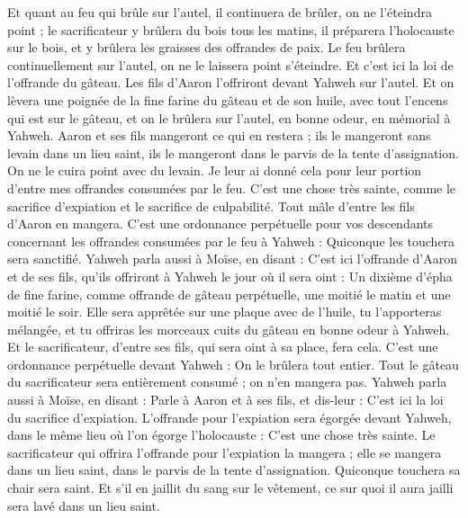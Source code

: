 \begin{multicols}{2}
Et quant au feu qui brûle sur l'autel, il continuera de brûler, on ne l'éteindra point ; le sacrificateur y brûlera du bois tous les matins, il préparera l'holocauste sur le bois, et y brûlera les graisses des offrandes de paix.
Le feu brûlera continuellement sur l'autel, on ne le laissera point s'éteindre.
Et c'est ici la loi de l'offrande du gâteau. Les fils d'Aaron l'offriront devant Yahweh sur l'autel.
Et on lèvera une poignée de la fine farine du gâteau et de son huile, avec tout l'encens qui est sur le gâteau, et on le brûlera sur l'autel, en bonne odeur, en mémorial à Yahweh.
Aaron et ses fils mangeront ce qui en restera ; ils le mangeront sans levain dans un lieu saint, ils le mangeront dans le parvis de la tente d'assignation.
On ne le cuira point avec du levain. Je leur ai donné cela pour leur portion d'entre mes offrandes consumées par le feu. C'est une chose très sainte, comme le sacrifice d'expiation et le sacrifice de culpabilité.
Tout mâle d'entre les fils d'Aaron en mangera. C'est une ordonnance perpétuelle pour vos descendants concernant les offrandes consumées par le feu à Yahweh : Quiconque les touchera sera sanctifié.
Yahweh parla aussi à Moïse, en disant :
C'est ici l'offrande d'Aaron et de ses fils, qu'ils offriront à Yahweh le jour où il sera oint : Un dixième d'épha de fine farine, comme offrande de gâteau perpétuelle, une moitié le matin et une moitié le soir.
Elle sera apprêtée sur une plaque avec de l'huile, tu l'apporteras mélangée, et tu offriras les morceaux cuits du gâteau en bonne odeur à Yahweh.
Et le sacrificateur, d'entre ses fils, qui sera oint à sa place, fera cela. C'est une ordonnance perpétuelle devant Yahweh : On le brûlera tout entier.
Tout le gâteau du sacrificateur sera entièrement consumé ; on n'en mangera pas.
Yahweh parla aussi à Moïse, en disant :
Parle à Aaron et à ses fils, et dis-leur : C'est ici la loi du sacrifice d'expiation. L'offrande pour l'expiation sera égorgée devant Yahweh, dans le même lieu où l'on égorge l'holocauste : C'est une chose très sainte.
Le sacrificateur qui offrira l'offrande pour l'expiation la mangera ; elle se mangera dans un lieu saint, dans le parvis de la tente d'assignation.
Quiconque touchera sa chair sera saint. Et s'il en jaillit du sang sur le vêtement, ce sur quoi il aura jailli sera lavé dans un lieu saint.

\end{multicols}

